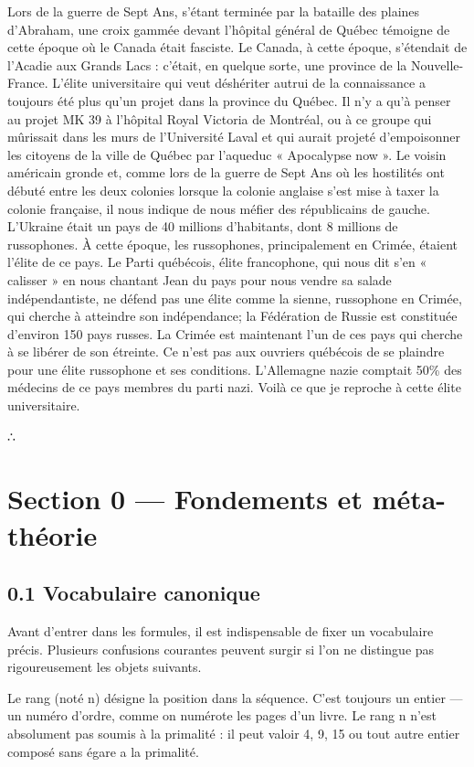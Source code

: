 \documentclass[11pt,a4paper]{article}
\begin{document}
Lors de la guerre de Sept Ans, s'étant terminée par la bataille des plaines d'Abraham, une croix gammée devant l'hôpital général de Québec témoigne de cette époque où le Canada était fasciste. Le Canada, à cette époque, s'étendait de l'Acadie aux Grands Lacs : c'était, en quelque sorte, une province de la Nouvelle-France. L'élite universitaire qui veut déshériter autrui de la connaissance a toujours été plus qu'un projet dans la province du Québec. Il n'y a qu'à penser au projet MK 39 à l'hôpital Royal Victoria de Montréal, ou à ce groupe qui mûrissait dans les murs de l'Université Laval et qui aurait projeté d'empoisonner les citoyens de la ville de Québec par l'aqueduc « Apocalypse now ». Le voisin américain gronde et, comme lors de la guerre de Sept Ans où les hostilités ont débuté entre les deux colonies lorsque la colonie anglaise s'est mise à taxer la colonie française, il nous indique de nous méfier des républicains de gauche. L'Ukraine était un pays de 40 millions d'habitants, dont 8 millions de russophones. À cette époque, les russophones, principalement en Crimée, étaient l'élite de ce pays. Le Parti québécois, élite francophone, qui nous dit s'en « calisser » en nous chantant Jean du pays pour nous vendre sa salade indépendantiste, ne défend pas une élite comme la sienne, russophone en Crimée, qui cherche à atteindre son indépendance; la Fédération de Russie est constituée d'environ 150 pays russes. La Crimée est maintenant l'un de ces pays qui cherche à se libérer de son étreinte. Ce n'est pas aux ouvriers québécois de se plaindre pour une élite russophone et ses conditions. L'Allemagne nazie comptait 50\% des médecins de ce pays membres du parti nazi. Voilà ce que je reproche à cette élite universitaire.

∴

\section{Section 0 — Fondements et méta-théorie}
\subsection{0.1 Vocabulaire canonique}

Avant d'entrer dans les formules, il est indispensable de fixer un vocabulaire précis. Plusieurs confusions courantes peuvent surgir si l'on ne distingue pas rigoureusement les objets suivants.

Le rang (noté n) désigne la position dans la séquence. C'est toujours un entier — un numéro d'ordre, comme on numérote les pages d'un livre. Le rang n n'est absolument pas soumis à la primalité : il peut valoir 4, 9, 15 ou tout autre entier composé sans égare a la primalité.
\end{document}
